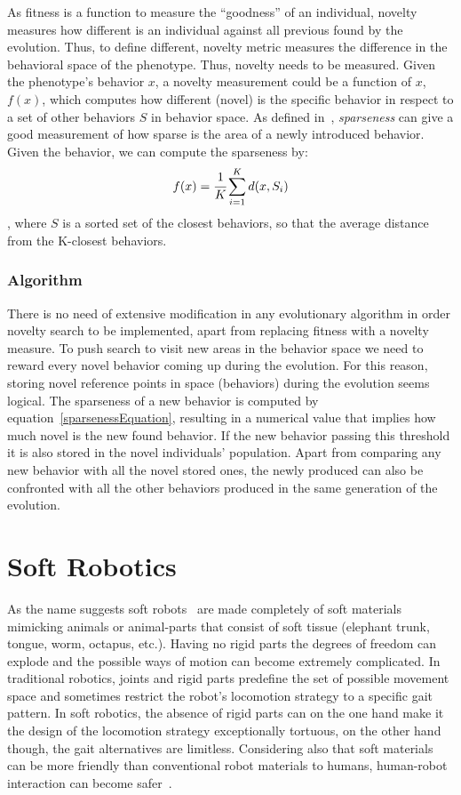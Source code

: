 As fitness is a function to measure the ``goodness'' of an individual, novelty measures how different is an individual against all previous found by the evolution. Thus, to define different, novelty metric measures the difference in the behavioral space of the phenotype. Thus, novelty needs to be measured. Given the phenotype's behavior $x$, a novelty measurement could be a function of $x$, $f(x)$, which computes how different (novel) is the specific behavior in respect to a set of other behaviors $S$ in behavior space.  As defined in~\cite{lehman2008exploiting,lehman2011abandoning}, \emph{sparseness} can give a good measurement of how sparse is the area of a newly introduced behavior. Given the behavior, we can compute the sparseness by:
\begin{equation}
\label{sparsenessEquation}
f(x) = \cfrac{1}{K} \sum_{i=1}^{K} d(x, S_i)
\end{equation}
, where $S$ is a sorted set of the closest behaviors, so that the average distance from the K-closest behaviors.


\subsubsection*{Algorithm}

There is no need of extensive modification in any evolutionary algorithm in order novelty search to be implemented, apart from replacing fitness with a novelty measure. To push search to visit new areas in the behavior space we need to reward every novel behavior coming up during the evolution. For this reason, storing novel reference points in space (behaviors) during the evolution seems logical. The sparseness of a new behavior is computed by equation~\ref{sparsenessEquation}, resulting in a numerical value that implies how much novel is the new found behavior. If the new behavior passing this threshold it is also stored in the novel individuals' population. Apart from comparing any new behavior with all the novel stored ones, the newly produced can also be confronted with all the other behaviors produced in the same generation of the evolution.




\section{Soft Robotics}
As the name suggests soft robots~\cite{trivedi2008soft, pfeifer2012challenges} are made completely of soft materials mimicking animals or animal-parts that consist of soft tissue (elephant trunk, tongue, worm, octapus, etc.). Having no rigid parts the degrees of freedom can explode and the possible ways of motion can become extremely complicated. In traditional  robotics, joints and rigid parts predefine the set of possible movement space and sometimes restrict the robot's locomotion strategy to a specific gait pattern. In soft robotics, the absence of rigid parts can on the one hand make it the design of the locomotion strategy exceptionally tortuous, on the other hand though, the gait alternatives are limitless. Considering also that soft materials can be more friendly than conventional robot materials to humans, human-robot interaction can become safer~\cite{sanan2011continuum}.

